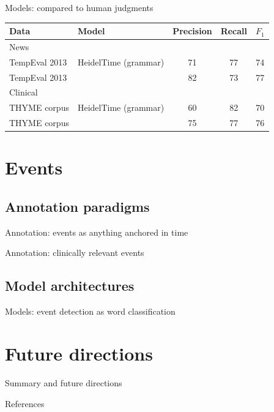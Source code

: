 \documentclass[12pt,compress]{beamer}
\begin{document}
\begin{frame}{Models: compared to human judgments}
\begin{tabular}{ l l c c c }
\hline\hline
Data & Model & Precision & Recall & $F_1$ \\
\hline
News \\
\hline
TempEval 2013 & HeidelTime (grammar) & 71 & 77 & 74 \\
TempEval 2013 & \cite{laparra-etal:2018:TACL} & 82 & 73 & 77 \\
\hline
\pause
Clinical \\
\hline
THYME corpus & HeidelTime (grammar) & 60 & 82 & 70 \\
THYME corpus & \cite{laparra-etal:2018:TACL} & 75 & 77 & 76 \\
\hline\hline
\end{tabular}
\end{frame}


\section{Events}


\subsection{Annotation paradigms}


\begin{frame}{Annotation: events as anything anchored in time}
\end{frame}


\begin{frame}{Annotation: clinically relevant events}
\end{frame}




\subsection{Model architectures}

\begin{frame}{Models: event detection as word classification}
\end{frame}


\section{Future directions}


\begin{frame}{Summary and future directions}
\end{frame}


\begin{frame}[allowframebreaks]{References}
\printbibliography
\end{frame}
\end{document}
